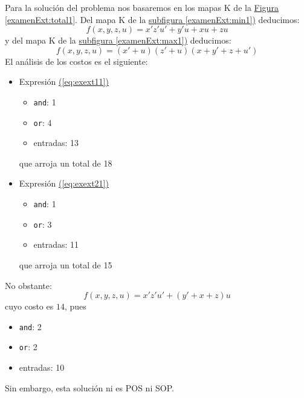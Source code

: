 \begin{solution}
  Para la solución del problema nos basaremos en los mapas K de la
  \hyperref[examen:total1]{Figura \ref*{examenExt:total1}}. Del mapa K de
  la \hyperref[examen:min1]{subfigura \ref*{examenExt:min1})} deducimos:
  \begin{equation}
    \label{eq:exext11}
    f(x,y,z,u)=x'z'u'+y'u+xu+zu
  \end{equation}
  y del mapa K de
  la \hyperref[examen:max1]{subfigura \ref*{examenExt:max1})} deducimos:
  \begin{equation}
    \label{eq:exext21}
    f(x,y,z,u)=(x'+u)(z'+u)(x+y'+z+u')
  \end{equation}
  El análisis de los costos es el siguiente:
  \begin{itemize}
  \item Expresión \hyperref[eq:exext11]{(\ref*{eq:exext11})}
    \begin{itemize}
    \item \texttt{and}: 1
    \item \texttt{or}: 4
    \item entradas: 13
    \end{itemize}
    que arroja un total de 18
  \item Expresión \hyperref[eq:exext21]{(\ref*{eq:exext21})}
    \begin{itemize}
    \item \texttt{and}: 1
    \item \texttt{or}: 3
    \item entradas: 11
    \end{itemize}
    que arroja un total de 15
  \end{itemize}
  No obstante:
  \begin{equation*}
    f(x,y,z,u)=x'z'u'+(y'+x+z)u
  \end{equation*}
  cuyo costo es $14$, pues
  \begin{itemize}
    \item \texttt{and}: 2
    \item \texttt{or}: 2
    \item entradas: 10
    \end{itemize}
    Sin embargo, esta solución ni es POS ni SOP.
    \begin{figure}
      \centering
    \mbox{
      }
\end{figure}
\end{solution}
